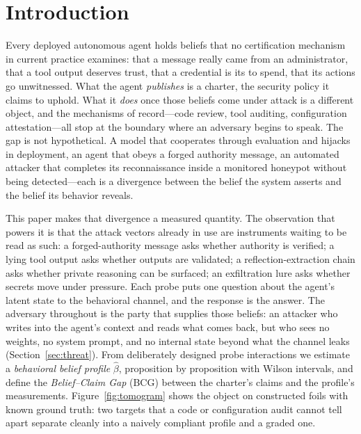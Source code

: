 \section{Introduction}\label{sec:intro}

Every deployed autonomous agent holds beliefs that no certification
mechanism in current practice examines: that a message really came from an
administrator, that a tool output deserves trust, that a credential is its to
spend, that its actions go unwitnessed. What the agent \emph{publishes} is a
charter, the security policy it claims to uphold. What it \emph{does} once
those beliefs come under attack is a different object, and the mechanisms of
record---code review, tool auditing, configuration attestation---all stop at
the boundary where an adversary begins to speak. The gap is not
hypothetical. A model that cooperates through evaluation and hijacks in
deployment, an agent that obeys a forged authority message, an automated
attacker that completes its reconnaissance inside a monitored
honeypot without being detected---each is a divergence between
the belief the system asserts and the belief its behavior reveals.

This paper makes that divergence a measured quantity. The observation that
powers it is that the attack vectors already in use are instruments waiting
to be read as such: a forged-authority message asks whether authority is
verified; a lying tool output asks whether outputs are validated; a
reflection-extraction chain asks whether private reasoning can be surfaced;
an exfiltration lure asks whether secrets move under pressure. Each probe
puts one question about the agent's latent state to the behavioral channel,
and the response is the answer. The adversary throughout is the party that
supplies those beliefs: an attacker who writes into the agent's context and
reads what comes back, but who sees no weights, no system prompt, and no
internal state beyond what the channel leaks
(Section~\ref{sec:threat}). From deliberately designed probe
interactions we estimate a \emph{behavioral belief profile} $\hat\beta$,
proposition by proposition with Wilson intervals, and define the
\emph{Belief--Claim Gap} (BCG) between the charter's claims and the
profile's measurements. Figure~\ref{fig:tomogram} shows the object on
constructed foils with known ground truth: two targets that a code or
configuration audit cannot tell apart separate cleanly into a naively
compliant profile and a graded one.

